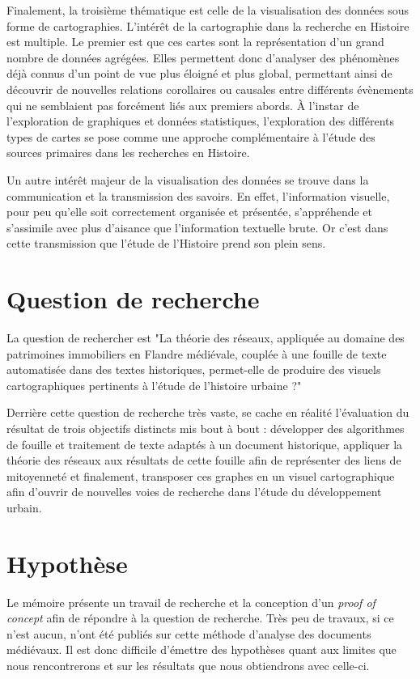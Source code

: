 Finalement, la troisième thématique est celle de la visualisation des données sous forme de cartographies. L’intérêt de la cartographie dans la recherche en Histoire est multiple. Le premier est que ces cartes sont la représentation d’un grand nombre de données agrégées. Elles permettent donc d’analyser des phénomènes déjà connus d’un point de vue plus éloigné et plus global, permettant ainsi de découvrir de nouvelles relations corollaires ou causales entre différents évènements qui ne semblaient pas forcément liés aux premiers abords. À l’instar de l’exploration de graphiques et données statistiques, l’exploration des différents types de cartes se pose comme une approche complémentaire à l’étude des sources primaires dans les recherches en Histoire.

Un autre intérêt majeur de la visualisation des données se trouve dans la communication et la transmission des savoirs. En effet, l’information visuelle, pour peu qu’elle soit correctement organisée et présentée, s’appréhende et s’assimile avec plus d’aisance que l’information textuelle brute. Or c’est dans cette transmission que l’étude de l’Histoire prend son plein sens.

\section{Question de recherche}
 La question de rechercher est "La théorie des réseaux, appliquée au domaine des patrimoines immobiliers en Flandre médiévale, couplée à une fouille de texte automatisée dans des textes historiques, permet-elle de produire des visuels cartographiques pertinents à l’étude de l’histoire urbaine ?"
 
 Derrière cette question de recherche très vaste, se cache en réalité l'évaluation du résultat de trois objectifs distincts mis bout à bout : développer des algorithmes de fouille et traitement de texte adaptés à un document historique, appliquer la théorie des réseaux aux résultats de cette fouille afin de représenter des liens de mitoyenneté et finalement, transposer ces graphes en un visuel cartographique afin d'ouvrir de nouvelles voies de recherche dans l'étude du développement urbain.
 
\section{Hypothèse}
Le mémoire présente un travail de recherche et la conception d'un \textit{proof of concept} afin de répondre à la question de recherche. Très peu de travaux, si ce n'est aucun, n'ont été publiés sur cette méthode d'analyse des documents médiévaux. Il est donc difficile d'émettre des hypothèses quant aux limites que nous rencontrerons et sur les résultats que nous obtiendrons avec celle-ci.

